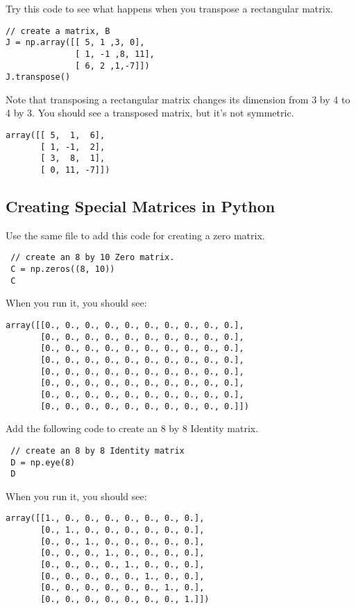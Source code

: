 Try this code to see what happens when you transpose a rectangular matrix. 
\begin{Verbatim}
// create a matrix, B
J = np.array([[ 5, 1 ,3, 0], 
              [ 1, -1 ,8, 11], 
              [ 6, 2 ,1,-7]])
J.transpose()
\end{Verbatim}
Note that transposing a rectangular matrix changes its dimension from 3 by 4 to 4 by 3. You should see a transposed matrix, but it's not symmetric.
\begin{Verbatim}
array([[ 5,  1,  6],
       [ 1, -1,  2],
       [ 3,  8,  1],
       [ 0, 11, -7]])
\end{Verbatim}

\subsection{Creating Special Matrices in Python}
 Use the same file to add this code for creating a zero matrix.
\begin{Verbatim}
 // create an 8 by 10 Zero matrix.
 C = np.zeros((8, 10))
 C
\end{Verbatim}
When you run it, you should see:
\begin{Verbatim}
array([[0., 0., 0., 0., 0., 0., 0., 0., 0., 0.],
       [0., 0., 0., 0., 0., 0., 0., 0., 0., 0.],
       [0., 0., 0., 0., 0., 0., 0., 0., 0., 0.],
       [0., 0., 0., 0., 0., 0., 0., 0., 0., 0.],
       [0., 0., 0., 0., 0., 0., 0., 0., 0., 0.],
       [0., 0., 0., 0., 0., 0., 0., 0., 0., 0.],
       [0., 0., 0., 0., 0., 0., 0., 0., 0., 0.],
       [0., 0., 0., 0., 0., 0., 0., 0., 0., 0.]])
\end{Verbatim}
Add the following code to create an 8 by 8 Identity matrix.
\begin{Verbatim}
 // create an 8 by 8 Identity matrix 
 D = np.eye(8)
 D
\end{Verbatim}
When you run it, you should see:
\begin{Verbatim}
array([[1., 0., 0., 0., 0., 0., 0., 0.],
       [0., 1., 0., 0., 0., 0., 0., 0.],
       [0., 0., 1., 0., 0., 0., 0., 0.],
       [0., 0., 0., 1., 0., 0., 0., 0.],
       [0., 0., 0., 0., 1., 0., 0., 0.],
       [0., 0., 0., 0., 0., 1., 0., 0.],
       [0., 0., 0., 0., 0., 0., 1., 0.],
       [0., 0., 0., 0., 0., 0., 0., 1.]])
\end{Verbatim}

